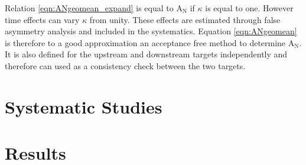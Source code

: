 Relation \ref{eqn:ANgeomean_expand} is equal to A$_{\mathrm{N}}$ if $\kappa$ is
equal to one.  However time effects can vary $\kappa$ from unity. These effects
are estimated through false asymmetry analysis and included in the systematics.
Equation \ref{eqn:ANgeomean} is therefore to a good approximation an acceptance
free method to determine A$_{\mathrm{N}}$.  It is also defined for the upstream
and downstream targets independently and therefore can used as a consistency
check between the two targets.

\section{Systematic Studies}

\section{Results} 
